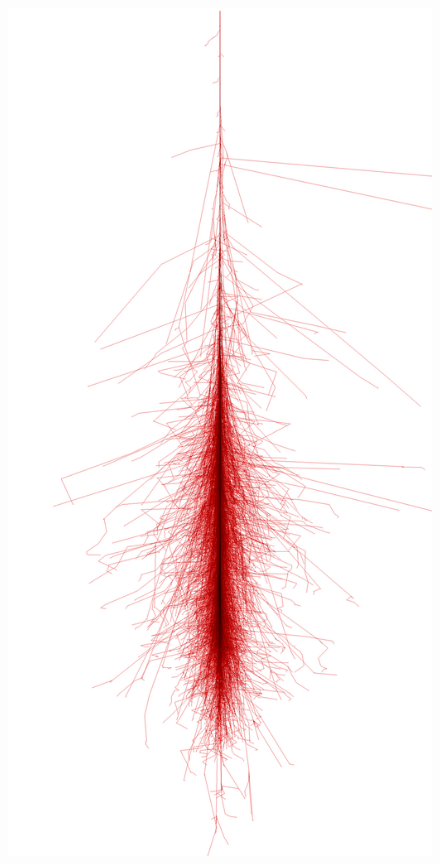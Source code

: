 \documentclass[aspectratio=1610, professionalfonts, 9pt]{beamer}
\begin{document}
\begin{frame}
  \begin{columns}
	\begin{figure}
	  \centering
	  \includegraphics[width=\textwidth]{./images/photon_100GeV.png}

\end{figure}
\end{columns}
\end{frame}
\end{document}
